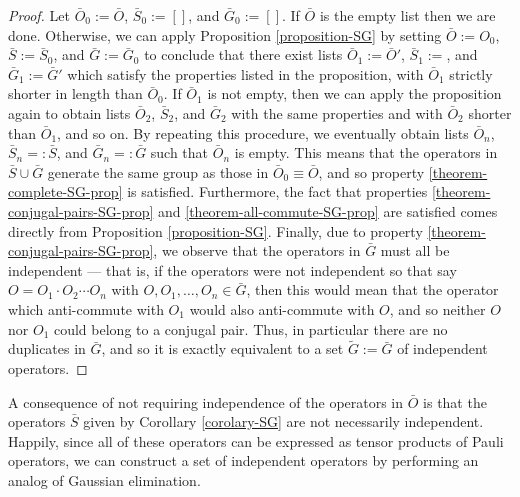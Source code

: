 \documentclass[twocolumn,showpacs,preprintnumbers,amsmath,amssymb,nofootinbib,pra,floatfix]{revtex4}
\newenvironment{remark}[1][Remark]{\begin{trivlist}
\item[\hskip \labelsep {\bfseries #1}]}{\end{trivlist}}
\newcommand{\lst}{\bar}
\newcommand{\set}{\tilde}
\begin{document}
\begin{proof}
Let $\lst O_0:=\lst O$, $\lst S_0:=[]$, and $\lst G_0:=[]$.  If $\lst O$ is the empty list then we are done.  Otherwise, we can apply Proposition \ref{proposition-SG} by setting $\lst O := O_0$, $\lst S:=\lst S_0$, and $\lst G := \lst G_0$ to conclude that there exist lists $\lst O_1:=\lst O'$, $\lst S_1:=$, and $\lst G_1:=\lst G'$ which satisfy the properties listed in the proposition, with $\lst O_1$ strictly shorter in length than $\lst O_0$.  If $\lst O_1$ is not empty, then we can apply the proposition again to obtain lists $\lst O_2$, $\lst S_2$, and $\lst G_2$ with the same properties and with $\lst O_2$ shorter than $\lst O_1$, and so on.  By repeating this procedure, we eventually obtain lists $\lst O_n$, $\lst S_n=:\lst S$, and $\lst G_n=:\lst G$ such that $\lst O_n$ is empty.  This means that the operators in $\lst S \cup \lst G$ generate the same group as those in $\lst O_0\equiv \lst O$, and so property \ref{theorem-complete-SG-prop} is satisfied.  Furthermore, the fact that properties \ref{theorem-conjugal-pairs-SG-prop} and \ref{theorem-all-commute-SG-prop} are satisfied comes directly from Proposition \ref{proposition-SG}.  Finally, due to property \ref{theorem-conjugal-pairs-SG-prop}, we observe that the operators in $\lst G$ must all be independent --- that is, if the operators were not independent so that say $O=O_1\cdot O_2\cdots O_n$ with $O,O_1,\dots,O_n\in\lst G$, then this would mean that the operator which anti-commute with $O_1$ would also anti-commute with $O$, and so neither $O$ nor $O_1$ could belong to a conjugal pair.  Thus, in particular there are no duplicates in $\lst G$, and so it is exactly equivalent to a set $\set G:=\lst G$ of independent operators.
\end{proof}
\begin{remark}
A consequence of not requiring independence of the operators in $\lst O$ is that the operators $\lst S$ given by Corollary \ref{corolary-SG} are not necessarily independent.  Happily, since all of these operators can be expressed as tensor products of Pauli operators, we can construct a set of independent operators by performing an analog of Gaussian elimination.
\end{remark}
\end{document}
